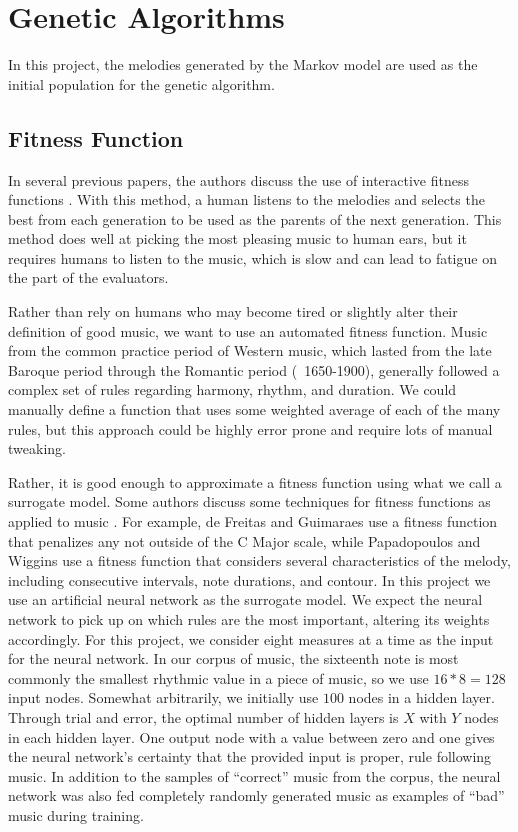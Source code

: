 \chapter{Genetic Algorithms} \label{ga}

In this project, the melodies generated by the Markov model are used as the initial population for the genetic algorithm.

\section{Fitness Function} \label{ga:fitness}

In several previous papers, the authors discuss the use of interactive fitness functions \cite{papadopoulos_ai_1999} \cite{mcvicar_autoguitartab:_2015}.
With this method, a human listens to the melodies and selects the best from each generation to be used as the parents of the next generation.
This method does well at picking the most pleasing music to human ears, but it requires humans to listen to the music, which is slow and can lead to fatigue on the part of the evaluators.

Rather than rely on humans who may become tired or slightly alter their definition of good music, we want to use an automated fitness function.
Music from the common practice period of Western music, which lasted from the late Baroque period through the Romantic period (~1650-1900), generally followed a complex set of rules regarding harmony, rhythm, and duration.
We could manually define a function that uses some weighted average of each of the many rules, but this approach could be highly error prone and require lots of manual tweaking.

Rather, it is good enough to approximate a fitness function using what we call a surrogate model. %
Some authors discuss some techniques for fitness functions as applied to music \cite{papadopoulos_ai_1999} \cite{de_freitas_originality_2011} \cite{alfonseca_fitness_2006}.
For example, de Freitas and Guimaraes use a fitness function that penalizes any not outside of the C Major scale, while Papadopoulos and Wiggins use a fitness function that considers several characteristics of the melody, including consecutive intervals, note durations, and contour.
In this project we use an artificial neural network as the surrogate model.
We expect the neural network to pick up on which rules are the most important, altering its weights accordingly.
For this project, we consider eight measures at a time as the input for the neural network.
In our corpus of music, the sixteenth note is most commonly the smallest rhythmic value in a piece of music, so we use $16 * 8 = 128$ input nodes.
Somewhat arbitrarily, we initially use $100$ nodes in a hidden layer.
Through trial and error, the optimal number of hidden layers is $X$ with $Y$ nodes in each hidden layer. %
One output node with a value between zero and one gives the neural network's certainty that the provided input is proper, rule following music.
In addition to the samples of ``correct'' music from the corpus, the neural network was also fed completely randomly generated music as examples of ``bad'' music during training.

